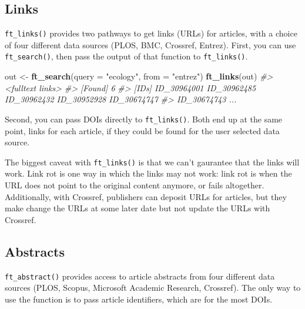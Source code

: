 \documentclass[author-year, review, 11pt]{components/elsarticle} %
\newenvironment{Shaded}{\begin{snugshade}}{\end{snugshade}}
\newcommand{\AlertTok}[1]{\textcolor[rgb]{0.94,0.16,0.16}{#1}}
\newcommand{\CommentTok}[1]{\textcolor[rgb]{0.56,0.35,0.01}{\textit{#1}}}
\newcommand{\DataTypeTok}[1]{\textcolor[rgb]{0.13,0.29,0.53}{#1}}
\newcommand{\KeywordTok}[1]{\textcolor[rgb]{0.13,0.29,0.53}{\textbf{#1}}}
\newcommand{\NormalTok}[1]{#1}
\newcommand{\OperatorTok}[1]{\textcolor[rgb]{0.81,0.36,0.00}{\textbf{#1}}}
\newcommand{\StringTok}[1]{\textcolor[rgb]{0.31,0.60,0.02}{#1}}
\begin{document}
\hypertarget{links}{%
\subsection{Links}\label{links}}

\texttt{ft\_links()} provides two pathways to get links (URLs) for
articles, with a choice of four different data sources (PLOS, BMC,
Crossref, Entrez). First, you can use \texttt{ft\_search()}, then pass
the output of that function to \texttt{ft\_links()}.

\begin{Shaded}
\begin{Highlighting}[]
\NormalTok{out <-}\StringTok{ }\KeywordTok{ft_search}\NormalTok{(}\DataTypeTok{query =} \StringTok{"ecology"}\NormalTok{, }\DataTypeTok{from =} \StringTok{"entrez"}\NormalTok{)}
\KeywordTok{ft_links}\NormalTok{(out)}
\CommentTok{#> <fulltext links>}
\CommentTok{#> [Found] 6 }
\CommentTok{#> [IDs] ID_30964001 ID_30962485 ID_30962432 ID_30952928 ID_30674747}
\CommentTok{#>      ID_30674743 ...}
\end{Highlighting}
\end{Shaded}

Second, you can pass DOIs directly to \texttt{ft\_links()}. Both end up
at the same point, links for each article, if they could be found for
the user selected data source.

\begin{Shaded}
\end{Shaded}

The biggest caveat with \texttt{ft\_links()} is that we can't gaurantee
that the links will work. Link rot is one way in which the links may not
work: link rot is when the URL does not point to the original content
anymore, or fails altogether. Additionally, with Crossref, publishers
can deposit URLs for articles, but they make change the URLs at some
later date but not update the URLs with Crossref.

\hypertarget{abstracts}{%
\subsection{Abstracts}\label{abstracts}}

\texttt{ft\_abstract()} provides access to article abstracts from four
different data sources (PLOS, Scopus, Microsoft Academic Research,
Crossref). The only way to use the function is to pass article
identifiers, which are for the most DOIs.
\end{document}

